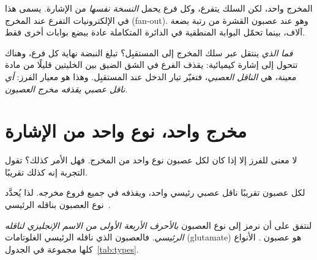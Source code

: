المخرج واحد، لكن السلك يتفرع، وكل فرع يحمل \emph{النسخة نفسها} من الإشارة. يسمى هذا في الإلكترونيات التفرع عند المخرج (\foreignlanguage{english}{fan-out}). وهو عند عصبون القشرة من رتبة بضعة آلاف، بينما تحمّل البوابة المنطقية في الدائرة المتكاملة عادة ببضع بوابات أخرى فقط.

\emph{فما الذي} ينتقل عبر سلك المخرج إلى المستقبِل؟ تبلغ النبضة نهاية كل فرع، وهناك تتحول إلى إشارة كيميائية: يقذف الفرع في الشق الضيق بين الخليتين قليلًا من مادة معينة، هي \emph{الناقل العصبي}، فتغيّر تيار الدخل عند المستقبِل. وهذا هو معيار الفرز: \emph{أي ناقل عصبي يقذفه مخرج العصبون}.

\section{مخرج واحد، نوع واحد من الإشارة}

لا معنى للفرز إلا إذا كان لكل عصبون نوع واحد من المخرج. فهل الأمر كذلك؟ تقول التجربة إنه كذلك تقريبًا.

\begin{keyblock}
\begin{proposition}
\label{prop:dale}
لكل عصبون تقريبًا ناقل عصبي رئيسي واحد، ويقذفه في جميع فروع مخرجه. لذا يُحدَّد نوع العصبون بناقله الرئيسي~\cite{Strata1999}.
\end{proposition}
\end{keyblock}

لنتفق على أن نرمز إلى نوع العصبون \emph{بالأحرف الأربعة الأولى من الاسم الإنجليزي لناقله الرئيسي}. فالعصبون الذي ناقله الرئيسي الغلوتامات (\foreignlanguage{english}{glutamate}) هو عصبون . الأنواع كلها مجموعة في الجدول~\ref{tab:types}.

